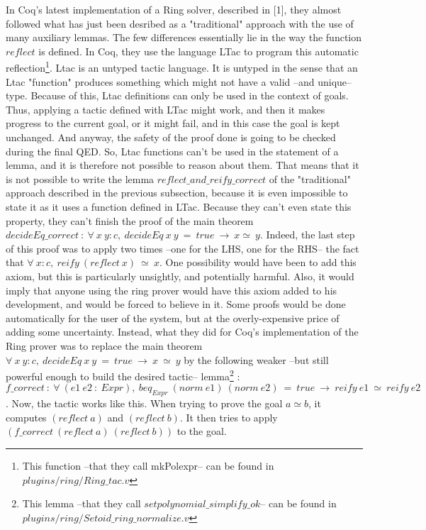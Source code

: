 In Coq's latest implementation of a Ring solver, described in [1], they almost followed what has just been desribed as a "traditional" approach with the use of many auxiliary lemmas. The few differences essentially lie in the way the function $reflect$ is defined. In Coq, they use the language LTac to program this automatic reflection\footnote{This function --that they call mkPolexpr-- can be found in $plugins/ring/Ring\_tac.v$}. Ltac is an untyped tactic language. It is untyped in the sense that an Ltac "function" produces something which might not have a valid  --and unique-- type. Because of this, Ltac definitions can only be used in the context of goals. Thus, applying a tactic defined with LTac might work, and then it makes progress to the current goal, or it might fail, and in this case the goal is kept unchanged. And anyway, the safety of the proof done is going to be checked during the final QED. So, Ltac functions can't be used in the statement of a lemma, and it is therefore not possible to reason about them. That means that it is not possible to write the lemma $reflect\_and\_reify\_correct$ of the "traditional" approach described in the previous subsection, because it is even impossible to state it as it uses a function defined in LTac. Because they can't even state this property, they can't finish the proof of the main theorem $decideEq\_correct\ :\ \forall\  x\ y:c,\ decideEq\ x\ y\ =\ true\ \rightarrow\ x \simeq\ y$. Indeed, the last step of this proof was to apply two times --one for the LHS, one for the RHS-- the fact that $\forall\ x:c,\ reify\ (reflect\ x)\ \simeq\ x$. One possibility would have been to add this axiom, but this is particularly unsightly, and potentially harmful. Also, it would imply that anyone using the ring prover would have this axiom added to his development, and would be forced to believe in it. Some proofs would be done automatically for the user of the system, but at the overly-expensive price of adding some uncertainty.
Instead, what they did for Coq's implementation of the Ring prover was to replace the main theorem $\forall\  x\ y:c,\ decideEq\ x\ y\ =\ true\ \rightarrow\ x\ \simeq\ y$ by the following weaker --but still powerful enough to build the desired tactic-- lemma\footnote{This lemma --that they call $setpolynomial\_simplify\_ok$-- can be found in $plugins/ring/Setoid\_ring\_normalize.v$}  : $f\_correct\ :\ \forall\ (e1\ e2\ :\ Expr),\ beq_{Expr}\ (norm\ e1)\ (norm\ e2)\ =\ true\ \rightarrow\ reify\ e1\ \simeq\ reify\ e2$.
Now, the tactic works like this. When trying to prove the goal $a \simeq b$, it computes $(reflect\ a)$ and $(reflect\ b)$. It then tries to apply $(f\_correct\ (reflect\ a)\ (reflect\ b))$ to the goal. 
